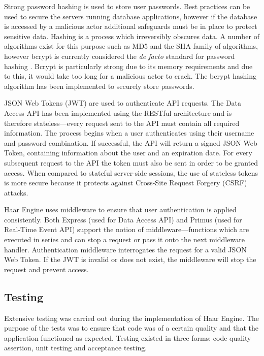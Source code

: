       Strong password hashing is used to store user passwords. Best practices can be used to secure the servers running database applications, however if the database is accessed by a malicious actor additional safeguards must be in place to protect sensitive data. Hashing is a process which irreversibly obscures data. A number of algorithms exist for this purpose such as MD5 and the SHA family of algorithms, however bcrypt is currently considered the \textit{de facto} standard for password hashing \citep{hashing-algorithms}. Bcrypt is particularly strong due to its memory requirements and due to this, it would take too long for a malicious actor to crack. The bcrypt hashing algorithm has been implemented to securely store passwords.

      JSON Web Tokens (JWT) are used to authenticate API requests. The Data Access API has been implemented using the RESTful architecture and is therefore stateless---every request sent to the API must contain all required information. The process begins when a user authenticates using their username and password combination. If successful, the API will return a signed JSON Web Token, containing information about the user and an expiration date. For every subsequent request to the API the token must also be sent in order to be granted access. When compared to stateful server-side sessions, the use of stateless tokens is more secure because it protects against Cross-Site Request Forgery (CSRF) attacks.

      Haar Engine uses middleware to ensure that user authentication is applied consistently. Both Express (used for Data Access API) and Primus (used for Real-Time Event API) support the notion of middleware---functions which are executed in series and can stop a request or pass it onto the next middleware handler. Authentication middleware interrogates the request for a valid JSON Web Token. If the JWT is invalid or does not exist, the middleware will stop the request and prevent access.


    \subsection{Testing}
      Extensive testing was carried out during the implementation of Haar Engine. The purpose of the tests was to ensure that code was of a certain quality and that the application functioned as expected. Testing existed in three forms: code quality assertion, unit testing and acceptance testing.

